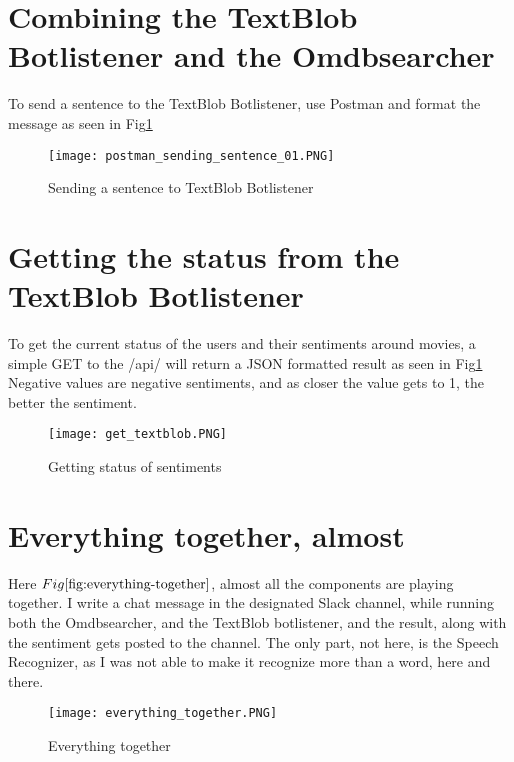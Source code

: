 \documentclass[11pt,fleqn]{book} %
\begin{document}
\newpage
\section{Combining the TextBlob Botlistener and the Omdbsearcher}
To send a sentence to the TextBlob Botlistener, use Postman and format the message as seen in Fig\ref{fig:sending-botlistener}
\begin{figure}[]
  \centering
   \texttt{[image: postman\_sending\_sentence\_01.PNG]}
  \caption{Sending a sentence to TextBlob Botlistener}
  \label{fig:sending-botlistener}
\end{figure}

\newpage
\section{Getting the status from the TextBlob Botlistener}
To get the current status of the users and their sentiments around movies, a simple GET to the /api/ will return a JSON formatted result as seen in Fig\ref{fig:sending-botlistener} Negative values are negative sentiments, and as closer the value gets to 1, the better the sentiment.
\begin{figure}[]
  \centering
   \texttt{[image: get\_textblob.PNG]}
  \caption{Getting status of sentiments}
  \label{fig:sentiment-status}
\end{figure}


\newpage
\section{Everything together, almost}
Here \(Fig\ref{fig:everything-together}\), almost all the components are playing together. I write a chat message in the designated Slack channel, while running both the Omdbsearcher, and the TextBlob botlistener, and the result, along with the sentiment gets posted to the channel.
The only part, not here, is the Speech Recognizer, as I was not able to make it recognize more than a word, here and there.

\begin{figure}[]
  \centering
   \texttt{[image: everything\_together.PNG]}
  \caption{Everything together}
  \label{fig:everything-together}
\end{figure}

\end{document}
